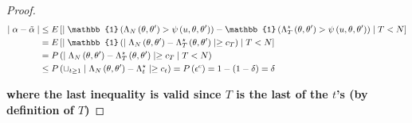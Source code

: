 \begin{proof}
\begin{equation*}
\begin{split}
\mid \alpha - \Tilde{\alpha}\mid &\leq
     E\left[\mid\mathbb{1}\left(\Lambda_N\left(\theta, \theta'\right)> \psi\left(u, \theta, \theta'\right)\right) -\mathbb{1}\left( \Lambda_T^{\star}\left(\theta, \theta'\right)>\psi\left(u, \theta, \theta'\right)\right)\mid T<N \right] \\ &= E\left[\mid \mathbb{1}\left(\mid \Lambda_N\left(\theta, \theta'\right) - \Lambda_T^{\star}\left(\theta, \theta'\right)\mid \geq c_T\right)\mid T<N\right]\\ &= P\left(\mid\Lambda_N\left(\theta, \theta'\right) - \Lambda_T^{\star}\left(\theta, \theta'\right)\mid \geq c_T \mid T < N \right) \\
     & \leq P\left(\cup_{t \geq 1} \mid \Lambda_N\left(\theta, \theta'\right) - \Lambda_t^{\star}\mid \geq c_t \right) = P\left(\epsilon^c\right) = 1 - \left( 1 - \delta\right) = \delta 
\end{split}
\end{equation*}

\textbf{where the last inequality is valid since $T$ is the last of the $t$'s (by definition of $T$)}
\end{proof}